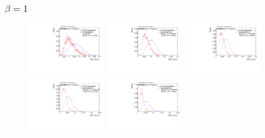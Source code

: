 \subsubsection*{$\beta=1$}\label{subsec:app_w_1}
\vspace{-0.5cm}
\begin{figure}[H]
\includegraphics[width=0.3\textwidth]{sascha_input/Appendix/Distributions/w/distributions/beta1/h_assisted_tj_C2_bin1.pdf} \hspace{1mm}
\includegraphics[width=0.3\textwidth]{sascha_input/Appendix/Distributions/w/distributions/beta1/h_assisted_tj_C2_bin2.pdf} \hspace{1mm}
\includegraphics[width=0.3\textwidth]{sascha_input/Appendix/Distributions/w/distributions/beta1/h_assisted_tj_C2_bin3.pdf} 
\bigskip
\includegraphics[width=0.3\textwidth]{sascha_input/Appendix/Distributions/w/distributions/beta1/h_assisted_tj_C2_bin4.pdf} \hspace{1mm}
\includegraphics[width=0.3\textwidth]{sascha_input/Appendix/Distributions/w/distributions/beta1/h_assisted_tj_C2_bin5.pdf} \hspace{1mm}

\end{figure}
